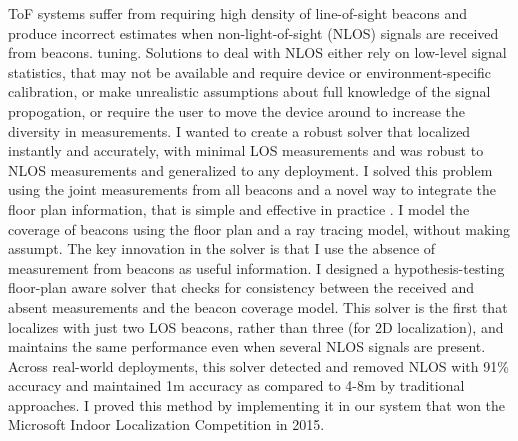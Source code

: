 \documentclass[10pt]{article}
\begin{document}
ToF systems suffer from requiring high density of line-of-sight beacons and produce incorrect estimates when non-light-of-sight (NLOS) signals are received from beacons. tuning.  Solutions to deal with NLOS either rely on low-level signal statistics, that may not be available and require device or environment-specific calibration, or make unrealistic assumptions about full knowledge of the signal propogation, or require the user to move the device around to increase the diversity in measurements. 
I wanted to create a robust solver that localized instantly and accurately, with minimal LOS measurements and was robust to NLOS measurements and generalized to any deployment.%
I solved this problem using the joint measurements from all beacons and a novel way to integrate the floor plan information, that is simple and effective in practice \cite{rajagopal2018enhancing}. I model the coverage of beacons using the floor plan and a ray tracing model, without making assumpt. %
The key innovation in the solver is that I use the absence of measurement from beacons as useful information. I designed a hypothesis-testing floor-plan aware solver that checks for consistency between the received and absent measurements and the beacon coverage model.
This solver is the first that localizes with just two LOS beacons, rather than three (for 2D localization), and maintains the same performance even when several NLOS signals are present. Across real-world deployments, this solver detected and removed NLOS with 91\% accuracy and maintained 1m accuracy as compared to 4-8m by traditional approaches. 
I proved this method by implementing it in our system that won the Microsoft Indoor Localization Competition in 2015. \\
\end{document}
